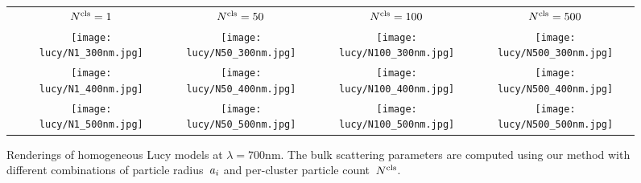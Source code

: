 \begin{figure}
    \centering
    \setlength{\resLen}{1.55in}
    \setlength{\raiseLen}{.75in}
    \addtolength{\tabcolsep}{-3.5pt}
    \small
	\begin{tabular}{ccccc}
		& ${N^\text{cls}}=1$ & ${N^\text{cls}}=50$ & ${N^\text{cls}}=100$ & ${N^\text{cls}}=500$
		\\
		\raisebox{\raiseLen}{\rotatebox[origin=c]{90}{$\radius_i=300\text{nm}$}} &
		\texttt{[image: lucy/N1\_300nm.jpg]} &
		\texttt{[image: lucy/N50\_300nm.jpg]} &
		\texttt{[image: lucy/N100\_300nm.jpg]} &
		\texttt{[image: lucy/N500\_300nm.jpg]}
		\\
		\raisebox{\raiseLen}{\rotatebox[origin=c]{90}{$\radius_i=400\text{nm}$}} &
		\texttt{[image: lucy/N1\_400nm.jpg]} &
		\texttt{[image: lucy/N50\_400nm.jpg]} &
		\texttt{[image: lucy/N100\_400nm.jpg]} &
		\texttt{[image: lucy/N500\_400nm.jpg]}
		\\
		\raisebox{\raiseLen}{\rotatebox[origin=c]{90}{$\radius_i=500\text{nm}$}} &
		\texttt{[image: lucy/N1\_500nm.jpg]} &
		\texttt{[image: lucy/N50\_500nm.jpg]} &
		\texttt{[image: lucy/N100\_500nm.jpg]} &
		\texttt{[image: lucy/N500\_500nm.jpg]}
	\end{tabular}
    \caption{\label{fig:lucycompare}
        Renderings of homogeneous Lucy models at $\lambda = 700\text{nm}$.
        The bulk scattering parameters are computed using our method with different combinations of particle radius~$a_i$ and per-cluster particle count~${N^\text{cls}}$.
    }
\end{figure}

